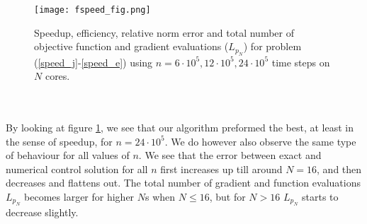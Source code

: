 \begin{figure}[!h]
\centering
\texttt{[image: fspeed\_fig.png]}
\centering
\caption{Speedup, efficiency, relative norm error and total number of objective function and gradient evaluations  ($L_{p_N}$) for problem (\ref{speed_j}-\ref{speed_e}) using $n=6\cdot 10^5,12\cdot 10^5,24\cdot 10^5$ time steps on $N$ cores.}
\label{speed_fig1}
\end{figure}
\\
\\
By looking at figure \ref{speed_fig1}, we see that our algorithm preformed the best, at least in the sense of speedup, for $n=24\cdot 10^5$. We do however also observe the same type of behaviour for all values of $n$. We see that the error between exact and numerical control solution for all $n$ first increases up till around $N=16$, and then decreases and flattens out. The total number of gradient and function evaluations $L_{p_N}$ becomes larger for higher $N$s when $N\leq 16$, but for $N>16$ $L_{p_N}$ starts to decrease slightly. 
